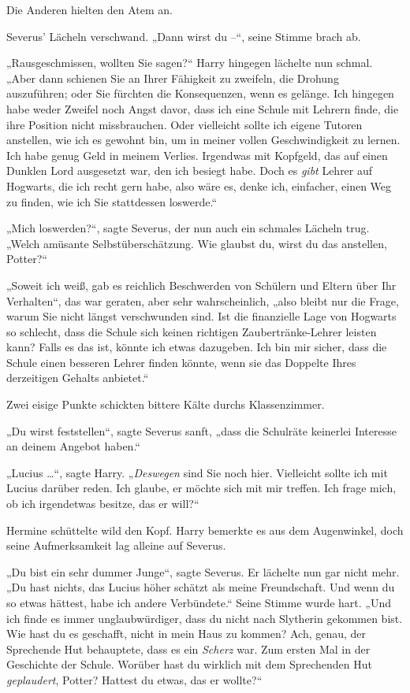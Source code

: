 {Die Anderen hielten den Atem an.

Severus' Lächeln verschwand. „Dann wirst du --“, seine Stimme brach ab.

„Rausgeschmissen, wollten Sie sagen?“ Harry hingegen lächelte nun schmal. „Aber dann schienen Sie an Ihrer Fähigkeit zu zweifeln, die Drohung auszuführen; oder Sie fürchten die Konsequenzen, wenn es gelänge. Ich hingegen habe weder Zweifel noch Angst davor, dass ich eine Schule mit Lehrern finde, die ihre Position nicht missbrauchen. Oder vielleicht sollte ich eigene Tutoren anstellen, wie ich es gewohnt bin, um in meiner vollen Geschwindigkeit zu lernen. Ich habe genug Geld in meinem Verlies. Irgendwas mit Kopfgeld, das auf einen Dunklen Lord ausgesetzt war, den ich besiegt habe. Doch es \emph{gibt} Lehrer auf Hogwarts, die ich recht gern habe, also wäre es, denke ich, einfacher, einen Weg zu finden, wie ich Sie stattdessen loswerde.“

„Mich loswerden?“, sagte Severus, der nun auch ein schmales Lächeln trug. „Welch amüsante Selbstüberschätzung. Wie glaubst du, wirst du das anstellen, Potter?“

„Soweit ich weiß, gab es reichlich Beschwerden von Schülern und Eltern über Ihr Verhalten“, das war geraten, aber sehr wahrscheinlich, „also bleibt nur die Frage, warum Sie nicht längst verschwunden sind. Ist die finanzielle Lage von Hogwarts so schlecht, dass die Schule sich keinen richtigen Zaubertränke-Lehrer leisten kann? Falls es das ist, könnte ich etwas dazugeben. Ich bin mir sicher, dass die Schule einen besseren Lehrer finden könnte, wenn sie das Doppelte Ihres derzeitigen Gehalts anbietet.“

Zwei eisige Punkte schickten bittere Kälte durchs Klassenzimmer.

„Du wirst feststellen“, sagte Severus sanft, „dass die Schulräte keinerlei Interesse an deinem Angebot haben.“

„Lucius …“, sagte Harry. „\emph{Deswegen} sind Sie noch hier. Vielleicht sollte ich mit Lucius darüber reden. Ich glaube, er möchte sich mit mir treffen. Ich frage mich, ob ich irgendetwas besitze, das er will?“

Hermine schüttelte wild den Kopf. Harry bemerkte es aus dem Augenwinkel, doch seine Aufmerksamkeit lag alleine auf Severus.

„Du bist ein sehr dummer Junge“, sagte Severus. Er lächelte nun gar nicht mehr. „Du hast nichts, das Lucius höher schätzt als meine Freundschaft. Und wenn du so etwas hättest, habe ich andere Verbündete.“ Seine Stimme wurde hart. „Und ich finde es immer unglaubwürdiger, dass du nicht nach Slytherin gekommen bist. Wie hast du es geschafft, nicht in mein Haus zu kommen? Ach, genau, der Sprechende Hut behauptete, dass es ein \emph{Scherz} war. Zum ersten Mal in der Geschichte der Schule. Worüber hast du wirklich mit dem Sprechenden Hut \emph{geplaudert}, Potter? Hattest du etwas, das er wollte?“

}

